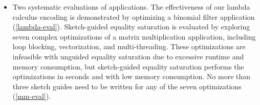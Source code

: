 \begin{itemize}


  \item Two systematic evaluations of \Rise{} applications.
  The effectiveness of our lambda calculus encoding is demonstrated by optimizing a binomial filter application (\cref{lambda-eval}).
  Sketch-guided equality saturation is evaluated by exploring seven complex optimizations of a matrix multiplication application, including loop blocking, vectorization, and multi-threading.
 These optimizations are infeasible with unguided equality saturation due to excessive runtime and memory consumption, but sketch-guided equality saturation performs the optimizations in seconds and with low memory consumption.
  No more than three sketch guides need to be written for any of the seven optimizations (\cref{mm-eval}).



\end{itemize}
